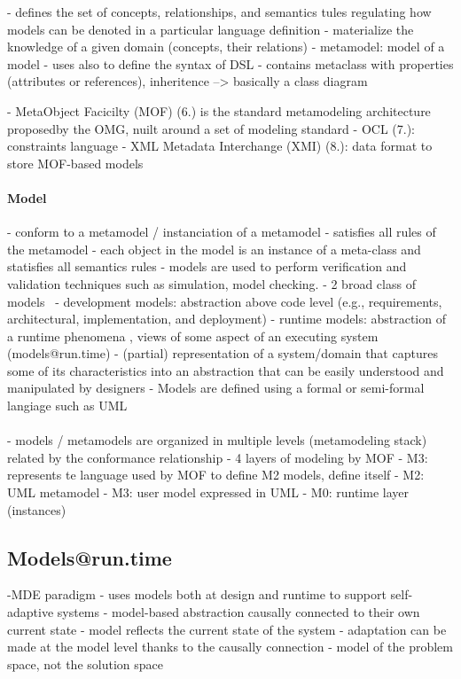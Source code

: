  - defines the set of concepts, relationships, and semantics tules regulating how models can be denoted in a particular language definition
        - materialize the knowledge of a given domain (concepts, their relations) \cite{DBLP:conf/iceccs/BezivinJT05}
- metamodel: model of a model
- uses also to define the syntax of DSL \cite{DBLP:journals/corr/ClarkSW15}
- contains metaclass with properties (attributes or references), inheritence --> basically a class diagram

- MetaObject Facicilty (MOF) (6.) is the standard metamodeling architecture proposedby the OMG, nuilt around a set of modeling standard
        - OCL (7.): constraints language
        - XML Metadata Interchange (XMI) (8.): data format to store MOF-based models

\paragraph{Model}
- conform to a metamodel / instanciation of a metamodel
	- satisfies all rules of the metamodel
        - each object in the model is an instance of a meta-class and statisfies all semantics rules
- models are used to perform verification and validation techniques such as simulation, model checking.
- 2 broad class of models~\cite{DBLP:conf/icse/FranceR07}
    - development models: abstraction above code level (e.g., requirements, architectural, implementation, and deployment)
    - runtime models: abstraction of a runtime phenomena   , views of some aspect of an executing system (models@run.time)
- (partial) representation of a system/domain that captures some of its characteristics into an abstraction that can be easily understood and manipulated by designers
    - Models are defined using a formal or semi-formal langiage such as UML
    
\paragraph{}
- models / metamodels are organized in multiple levels (metamodeling stack) related by the conformance relationship
 - 4 layers of modeling by MOF
        - M3: represents te language used by MOF to define M2 models, define itself
        - M2: UML metamodel 
        - M3: user model expressed in UML
        - M0: runtime layer (instances)
        
\subsection{Models@run.time}
-MDE paradigm \cite{DBLP:journals/computer/MorinBJFS09, DBLP:journals/computer/BlairBF09}
- uses models both at design and runtime to support self-adaptive systems
- model-based abstraction causally connected to their own current state
- model reflects the current state of the system
- adaptation can be made at the model level thanks to the causally connection
- model of the problem space, not the solution space

